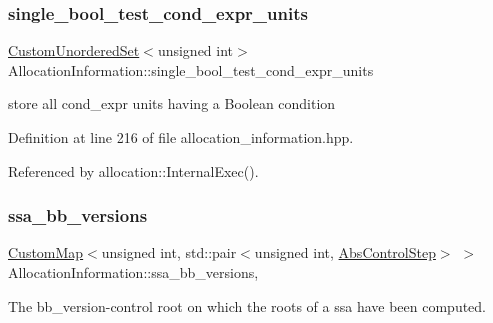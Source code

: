 \mbox{\label{classAllocationInformation_a61e9c863f269931e338ac07d5f734207}} 
\subsubsection{\texorpdfstring{single\+\_\+bool\+\_\+test\+\_\+cond\+\_\+expr\+\_\+units}{single\_bool\_test\_cond\_expr\_units}}
{\footnotesize\ttfamily \hyperlink{classCustomUnorderedSet}{Custom\+Unordered\+Set}$<$unsigned int$>$ Allocation\+Information\+::single\+\_\+bool\+\_\+test\+\_\+cond\+\_\+expr\+\_\+units\hspace{0.3cm}{\ttfamily [private]}}



store all cond\+\_\+expr units having a Boolean condition 



Definition at line 216 of file allocation\+\_\+information.\+hpp.



Referenced by allocation\+::\+Internal\+Exec().

\mbox{\label{classAllocationInformation_aef0739940e0bcfbb061eff338beb3444}} 
\subsubsection{\texorpdfstring{ssa\+\_\+bb\+\_\+versions}{ssa\_bb\_versions}}
{\footnotesize\ttfamily \hyperlink{custom__map_8hpp_a18ca01763abbe3e5623223bfe5aaac6b}{Custom\+Map}$<$unsigned int, std\+::pair$<$unsigned int, \hyperlink{structAbsControlStep}{Abs\+Control\+Step}$>$ $>$ Allocation\+Information\+::ssa\+\_\+bb\+\_\+versions\hspace{0.3cm}{\ttfamily [mutable]}, {\ttfamily [private]}}



The bb\+\_\+version-\/control root on which the roots of a ssa have been computed. 



